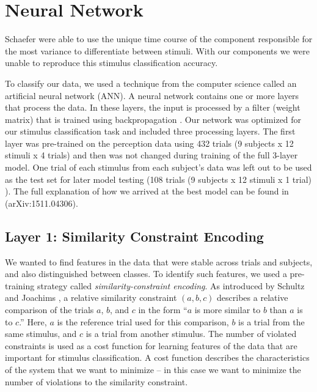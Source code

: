 \chapter{Neural Network}
Schaefer \etal \citeyear{schaefer_name_2011} were able to use the unique time course of the component responsible for the most variance to differentiate between stimuli.
With our components we were unable to reproduce this stimulus classification accuracy. 
 
To classify our data, we used a technique from the computer science called an artificial neural network (\ac{ANN}).
A neural network contains one or more layers that process the data.
In these layers, the input is processed by a filter (weight matrix) that is trained using backpropagation \cite{Rumelhart_backpropagation_1986}. 
Our network was optimized for our stimulus classification task and included three processing layers.
The first layer was pre-trained on the perception data using 432 trials (9 subjects x 12 stimuli x 4 trials) and then was not changed during training of the full 3-layer model. 
One trial of each stimulus from each subject's data was left out to be used as the test set for later model testing (108 trials (9 subjects x 12 stimuli x 1 trial) ).
The full explanation of how we arrived at the best model can be found in \cite{stober_ICLR2016} (arXiv:1511.04306).

\section{Layer 1: Similarity Constraint Encoding}
We wanted to find features in the data that were stable across trials and subjects, and also distinguished between classes. 
To identify such features, we used a pre-training strategy called \emph{similarity-constraint encoding}.
As introduced by Schultz and Joachims \citeyear{schultz_learning_2004}, a relative similarity constraint $(a,b,c)$ describes a relative comparison of the trials $a$, $b$, and $c$ in the form ``$a$ is more similar to $b$ than $a$ is to $c$.''
Here, $a$ is the reference trial used for this comparison, $b$ is a trial from the same stimulus, and $c$ is a trial from another stimulus.
The number of violated constraints is used as a cost function for learning features of the data that are important for stimulus classification. 
A cost function describes the characteristics of the system that we want to minimize -- in this case we want to minimize the number of violations to the similarity constraint.


